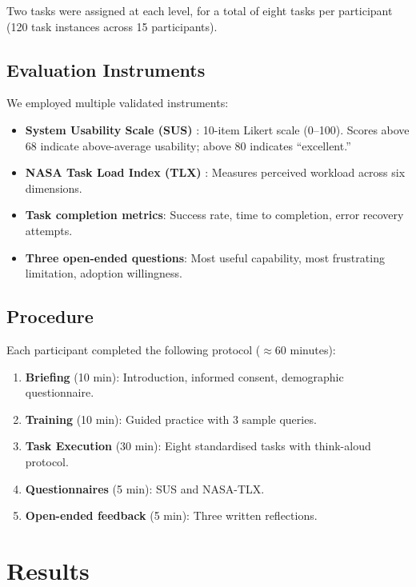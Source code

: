 \documentclass[acmsmall]{acmart}
\begin{document}
Two tasks were assigned at each level, for a total of eight tasks per participant (120 task instances across 15 participants).

\subsection{Evaluation Instruments}

We employed multiple validated instruments:
\begin{itemize}
    \item \textbf{System Usability Scale (SUS)} \cite{Brooke1996}: 10-item Likert scale (0--100). Scores above 68 indicate above-average usability; above 80 indicates ``excellent.''
    \item \textbf{NASA Task Load Index (TLX)} \cite{Hart1988}: Measures perceived workload across six dimensions.
    \item \textbf{Task completion metrics}: Success rate, time to completion, error recovery attempts.
    \item \textbf{Three open-ended questions}: Most useful capability, most frustrating limitation, adoption willingness.
\end{itemize}

\subsection{Procedure}

Each participant completed the following protocol ($\approx$60 minutes):
\begin{enumerate}
    \item \textbf{Briefing} (10 min): Introduction, informed consent, demographic questionnaire.
    \item \textbf{Training} (10 min): Guided practice with 3 sample queries.
    \item \textbf{Task Execution} (30 min): Eight standardised tasks with think-aloud protocol.
    \item \textbf{Questionnaires} (5 min): SUS and NASA-TLX.
    \item \textbf{Open-ended feedback} (5 min): Three written reflections.
\end{enumerate}


\section{Results}
\label{sec:results}
\end{document}
